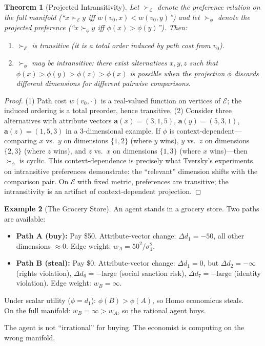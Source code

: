 \documentclass[12pt]{article}
\newtheorem{theorem}{Theorem}[section]
\theoremstyle{definition}
\newtheorem{example}[theorem]{Example}
\theoremstyle{remark}
\newcommand{\E}{\mathcal{E}}               %
\begin{document}
\begin{theorem}[Projected Intransitivity]
\label{thm:intransitivity}
Let $\succ_{\E}$ denote the preference relation on the full manifold (``$x \succ_{\E} y$ iff $w(v_0, x) < w(v_0, y)$'') and let $\succ_\phi$ denote the projected preference (``$x \succ_\phi y$ iff $\phi(x) > \phi(y)$'').  Then:
\begin{enumerate}
    \item $\succ_{\E}$ is transitive (it is a total order induced by path cost from $v_0$).
    \item $\succ_\phi$ may be intransitive: there exist alternatives $x, y, z$ such that $\phi(x) > \phi(y) > \phi(z) > \phi(x)$ is possible when the projection $\phi$ discards different dimensions for different pairwise comparisons.
\end{enumerate}
\end{theorem}

\begin{proof}
(1) Path cost $w(v_0, \cdot)$ is a real-valued function on vertices of $\E$; the induced ordering is a total preorder, hence transitive.  (2) Consider three alternatives with attribute vectors $\mathbf{a}(x) = (3, 1, 5)$, $\mathbf{a}(y) = (5, 3, 1)$, $\mathbf{a}(z) = (1, 5, 3)$ in a 3-dimensional example.  If $\phi$ is context-dependent---comparing $x$ vs.\ $y$ on dimensions $\{1,2\}$ (where $y$ wins), $y$ vs.\ $z$ on dimensions $\{2,3\}$ (where $z$ wins), and $z$ vs.\ $x$ on dimensions $\{1,3\}$ (where $x$ wins)---then $\succ_\phi$ is cyclic.  This context-dependence is precisely what Tversky's \cite{tversky1969} experiments on intransitive preferences demonstrate: the ``relevant'' dimension shifts with the comparison pair.  On $\E$ with fixed metric, preferences are transitive; the intransitivity is an artifact of context-dependent projection.
\end{proof}

\begin{example}[The Grocery Store]
\label{ex:grocery}
An agent stands in a grocery store.  Two paths are available:
\begin{itemize}
    \item \textbf{Path A (buy):} Pay \$50.  Attribute-vector change: $\Delta d_1 = -50$, all other dimensions $\approx 0$.  Edge weight: $w_A = 50^2 / \sigma_1^2$.
    \item \textbf{Path B (steal):} Pay \$0.  Attribute-vector change: $\Delta d_1 = 0$, but $\Delta d_2 = -\infty$ (rights violation), $\Delta d_6 = -\text{large}$ (social sanction risk), $\Delta d_7 = -\text{large}$ (identity violation).  Edge weight: $w_B = \infty$.
\end{itemize}
Under scalar utility ($\phi = d_1$): $\phi(B) > \phi(A)$, so Homo economicus steals.\\
On the full manifold: $w_B = \infty > w_A$, so the rational agent buys.

The agent is not ``irrational'' for buying.  The economist is computing on the wrong manifold.
\end{example}
\end{document}
